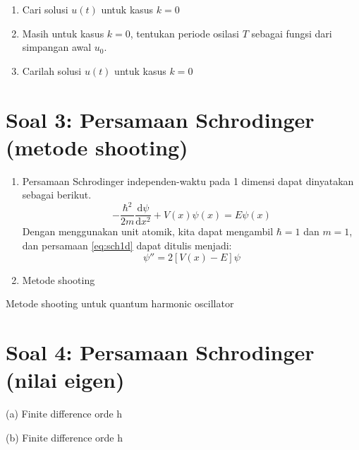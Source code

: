 \documentclass[12pt]{article}
\begin{document}
\begin{enumerate}[label=(\alph*)]
\item Cari solusi $u(t)$ untuk kasus $k=0$
\item Masih untuk kasus $k=0$, tentukan periode osilasi $T$ sebagai
fungsi dari simpangan awal $u_0$.
\item Carilah solusi $u(t)$ untuk kasus $k=0$
\end{enumerate}


\section{Soal 3: Persamaan Schrodinger (metode shooting)}

\begin{enumerate}[label=(\alph*)]
\item Persamaan Schrodinger independen-waktu pada 1 dimensi
dapat dinyatakan sebagai berikut.
\begin{equation}
-\frac{\hbar^2}{2m}\frac{\mathrm{d}\psi}{\mathrm{d}x^2}
+ V(x)\psi(x) = E\psi(x)
\label{eq:sch1d}
\end{equation}
Dengan menggunakan unit atomik, kita dapat mengambil $\hbar = 1$
dan $m = 1$, dan persamaan \eqref{eq:sch1d} dapat ditulis menjadi:
\begin{equation}
\psi'' = 2\left[ V(x) - E \right]\psi
\end{equation}

\item Metode shooting
\end{enumerate}

Metode shooting untuk quantum harmonic oscillator


\section{Soal 4: Persamaan Schrodinger (nilai eigen)}

(a) Finite difference orde h

(b) Finite difference orde h

%
%
%
%
%
%
%
\end{document}
